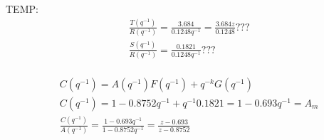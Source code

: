 \documentclass[fleqn]{article}
\newcommand \A {1 - 0.8752 q^{-1}}
\newcommand \B {0.1248 q^{-1}}
\newcommand \Am {1 - 0.693 q^{-1}}
\newcommand \Bm {3.684}
\newcommand \aOne {-0.8752}
\newcommand \amOne {-0.693}
\newcommand \bOne {0.1248}
\newcommand \G {0.1821}
\begin{document}
TEMP:
\begin{equation}\label{eq:calc_to_z}
\begin{split}
& \frac{T(q^{-1})}{R(q^{-1})} = \frac{\Bm}{\B} = \frac{\Bm z}{\bOne} ???\\
& \frac{S(q^{-1})}{R(q^{-1})} = \frac{\G}{\B} ??? \\
\end{split}
\end{equation}


\begin{equation}\label{eq:C}
\begin{split}
& C(q^{-1}) = A(q^{-1})F(q^{-1}) + q^{-k}G(q^{-1})  \\
& C(q^{-1}) = \A + q^{-1} \G = 1 - 0.693 q^{-1} = A_m  \\
& \frac{C(q^{-1})}{A(q^{-1})} = \frac{\Am}{\A}  = \frac{z \amOne}{z \aOne}\\
\end{split}
\end{equation}
\end{document}
